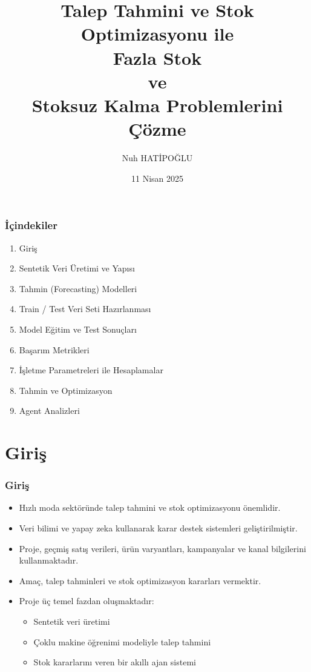 \documentclass[12pt]{beamer}
\title{Talep Tahmini ve Stok Optimizasyonu ile \\ Fazla Stok \\ ve \\ Stoksuz
	Kalma Problemlerini Çözme}
\author{Nuh HATİPOĞLU}
\date{11 Nisan 2025}
\begin{document}
	
	\begin{frame}
		\titlepage
	\end{frame}
	
	\begin{frame}
		\frametitle{İçindekiler}
		\begin{enumerate}
			\item Giriş
			\item Sentetik Veri Üretimi ve Yapısı
			\item Tahmin (Forecasting) Modelleri
			\item Train / Test Veri Seti Hazırlanması
			\item Model Eğitim ve Test Sonuçları
			\item Başarım Metrikleri
			\item İşletme Parametreleri ile Hesaplamalar
			\item Tahmin ve Optimizasyon
			\item Agent Analizleri
		\end{enumerate}
		
	\end{frame}
	
	\section{Giriş}
	\begin{frame}
		\frametitle{Giriş}
		\begin{itemize}
			\item Hızlı moda sektöründe talep tahmini ve stok
			optimizasyonu önemlidir.
			\item Veri bilimi ve yapay zeka kullanarak karar destek
			sistemleri geliştirilmiştir.
			\item Proje, geçmiş satış verileri, ürün varyantları,
			kampanyalar ve kanal bilgilerini kullanmaktadır.
			\item Amaç, talep tahminleri ve stok optimizasyon
			kararları vermektir.
			\item Proje üç temel fazdan oluşmaktadır:
			\begin{itemize}
				\item Sentetik veri üretimi
				\item Çoklu makine öğrenimi modeliyle talep
				tahmini
				\item Stok kararlarını veren bir akıllı ajan
				sistemi
			\end{itemize}
		\end{itemize}
	\end{frame}
	
\end{document}
